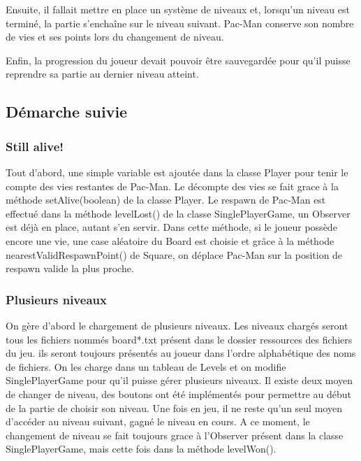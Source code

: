 \documentclass[a4paper,12pt]{report} %
\begin{document}
Ensuite, il fallait mettre en place un système de niveaux et, lorsqu'un
niveau est terminé, la partie s'enchaîne sur le niveau suivant. Pac-Man
conserve son nombre de vies et ses points lors du changement de niveau.

Enfin, la progression du joueur devait pouvoir être sauvegardée pour
qu'il puisse reprendre sa partie au dernier niveau atteint.

\subsection{Démarche suivie}
\subsubsection{Still alive!}
Tout d'abord, une simple variable est ajoutée dans la classe Player
pour tenir le compte des vies restantes de Pac-Man. Le décompte des
vies se fait grace à la méthode setAlive(boolean) de la classe Player.
Le respawn de Pac-Man est effectué dans la méthode levelLost() de
la classe SinglePlayerGame, un Observer est déjà en place, autant
s'en servir. Dans cette méthode, si le joueur possède encore une vie,
une case aléatoire du Board est choisie et grâce à la méthode nearestValidRespawnPoint()
de Square, on déplace Pac-Man sur la position de respawn valide la
plus proche.

\subsubsection{Plusieurs niveaux}
On gère d'abord le chargement de plusieurs niveaux. Les niveaux chargés
seront tous les fichiers nommés board{*}.txt présent dans le dossier
ressources des fichiers du jeu. ils seront toujours présentés au joueur
dans l'ordre alphabétique des noms de fichiers. On les charge dans
un tableau de Levels et on modifie SinglePlayerGame pour qu'il puisse
gérer plusieurs niveaux. Il existe deux moyen de changer de niveau,
des boutons ont été implémentés pour permettre au début de la partie
de choisir son niveau. Une fois en jeu, il ne reste qu'un seul moyen
d'accéder au niveau suivant, gagné le niveau en cours. A ce moment,
le changement de niveau se fait toujours grace à l'Observer présent
dans la classe SinglePlayerGame, mais cette fois dans la méthode levelWon().
\end{document}
